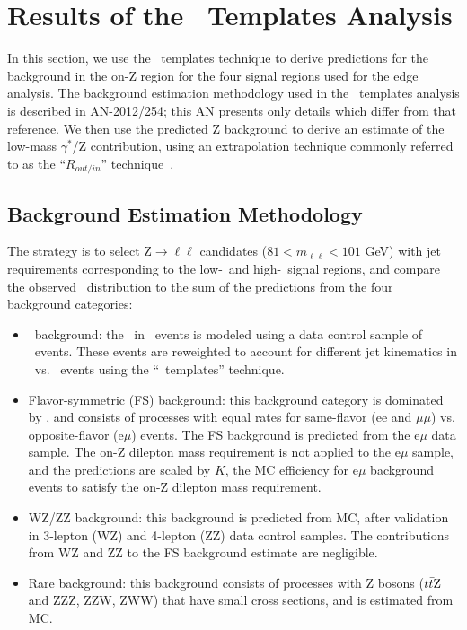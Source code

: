 \section{Results of the \MET\ Templates Analysis}
\label{sec:templates}

In this section, we use the \MET\ templates technique to derive predictions for the background in the on-Z region for the 
four signal regions used for the edge analysis. The background estimation methodology used in the \MET\ templates analysis
is described in AN-2012/254; this AN presents only details which differ from that reference. 
We then use the predicted Z background to derive an estimate of the low-mass $\gamma^*$/Z contribution,
using an extrapolation technique commonly referred to as the ``$R_{out/in}$'' technique~\cite{ref:routin}.

\subsection{Background Estimation Methodology}
\label{sec:templates_bkg}

The strategy is to select Z$\to\ell\ell$ candidates ($81<m_{\ell\ell}<101$ GeV) with jet requirements corresponding to the
low-\MET\ and high-\MET\ signal regions, and compare the observed \MET\ distribution to the sum of the predictions from the 
four background categories:

\begin{itemize}
\item \zjets\ background: the \MET\ in \zjets\ events is modeled using a data control sample of \gjets\ events. These events are reweighted
to account for different jet kinematics in \zjets\ vs. \gjets\ events using the ``\MET\ templates'' technique.
\item Flavor-symmetric (FS) background: this background category is dominated by \ttbar, and consists of processes with equal rates for same-flavor (ee and $\mu\mu$)
vs. opposite-flavor (e$\mu$) events. The FS background is predicted from the e$\mu$ data sample. The on-Z dilepton mass requirement is not applied to the e$\mu$ sample,
and the predictions are scaled by $K$, the MC efficiency for e$\mu$ background events to satisfy the on-Z dilepton mass requirement.
\item WZ/ZZ background: this background is predicted from MC, after validation in 3-lepton (WZ) and 4-lepton (ZZ) data control samples. The contributions from WZ and ZZ to the FS background estimate are negligible.
\item Rare background: this background consists of processes with Z bosons ($t\bar{t}\rm{Z}$ and ZZZ, ZZW, ZWW) that have small cross sections, and is estimated from MC.
\end{itemize}

